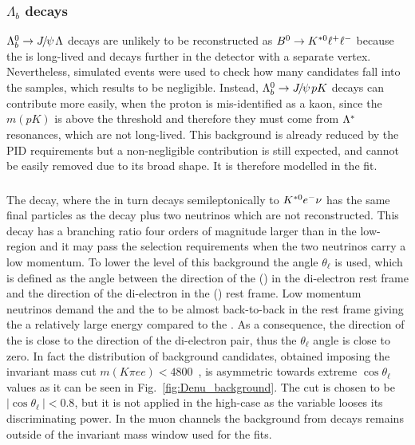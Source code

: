 \subsubsection{$\Lambda_b$ decays}

$\Lb\to\jpsi\Lz$ decays are unlikely to be reconstructed as ${{B}^0} \rightarrow {\ensuremath{{K}^{*0}}} \ell^+ \ell^-$ because
the \Lz is long-lived and decays further in the detector with a separate vertex.
Nevertheless, simulated events were used to check how many candidates fall into the \Bz samples, which results to be negligible. 
Instead, $\Lb\to\jpsi pK$ decays can contribute more easily, when the proton is mis-identified as a kaon,
 since the $m(pK)$ is above the \Lz threshold and therefore they must come from ${\Lambda}^*$ resonances, 
 which are not long-lived. This background is already
reduced by the PID requirements but a non-negligible contribution is still expected, 
and cannot be easily removed due to its broad shape. It is therefore modelled in the fit.

\subsubsection{ }

The \decay{\Bd}{\Dm\ep\nu} decay, where the \Dm in turn decays semileptonically to ${{K}^{*0}}{e^-}\nu$ has the same final particles
as the \BdToKstee decay plus two neutrinos which are not reconstructed. This decay has a branching ratio four orders of magnitude
larger than \BdToKstee in the low-\qsq region and it may pass the selection requirements when the two neutrinos carry a low momentum. 
To lower the level of this background the angle $\theta_\ell$ is used, which is defined as the angle between the direction of the \ep (\en)
in the di-electron rest frame and the direction of the di-electron in the \Bd (\Bdb) rest frame. 
Low momentum neutrinos demand the \Dm and the \ep to be almost back-to-back in the \Bd rest frame giving the \ep a relatively
large energy compared to the \en. As a consequence, the direction of the \ep is close to the direction of the di-electron pair, thus the
$\theta_\ell$ angle is close to zero. In fact the distribution of background candidates, obtained imposing the invariant mass cut
$m(K\pi ee) < 4800$~\mevcc, is asymmetric towards extreme $\cos \theta_\ell$ values as it can be seen in Fig.~\ref{fig:Denu_background}. 
The cut is chosen to be $|\cos \theta_\ell~|< 0.8$, but it is not applied in the high-\qsq case as the variable looses its discriminating power.
In the muon channels the background from  decays remains outside 
of the invariant mass window used for the fits.

